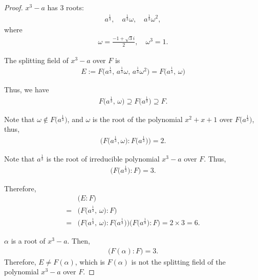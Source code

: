 \documentclass[utf8]{ctexbook}
\theoremstyle{definition}
\begin{document}
\begin{proof}
$x^3 - a$ has $3$ roots:
\begin{align*}
a^{\frac{1}{3}}, \quad a^{\frac{1}{3}}\omega, \quad a^{\frac{1}{3}} \omega^2, 
\end{align*}
where
\begin{align*}
\omega = \frac{-1 + \sqrt{3} i }{2}, \quad \omega^3 = 1.
\end{align*}

The splitting field of $x^3 - a$ over $F$ is
\begin{align*}
E := F\big(  a^{\frac{1}{3}}, \, a^{\frac{1}{3}}\omega, \, a^{\frac{1}{3}} \omega^2 \big) = F \big( a^{\frac{1}{3}} , \,   \omega \big)
\end{align*}

Thus, we have
\begin{align*}
 F \big( a^{\frac{1}{3}} , \,   \omega \big) \supseteq  F \big( a^{\frac{1}{3}} \big) \supseteq F .
\end{align*}

Note that $\omega \not \in  F \big( a^{\frac{1}{3}} \big) $, and $\omega $ is the root of the polynomial $x^2 + x + 1$ over $F \big( a^{\frac{1}{3}} \big) $, thus,
\begin{align*}
\big( F \big( a^{\frac{1}{3}}, \omega \big) : F \big( a^{\frac{1}{3}} \big)  \big) = 2 .
\end{align*} 

Note that $a^{\frac{1}{3}}$ is the root of irreducible polynomial $x^3 - a$ over $F$. Thus,
\begin{align*}
\big( F \big( a^{\frac{1}{3}} \big) : F \big) = 3 .
\end{align*}

Therefore,
\begin{align*}
& \big( E : F \big) \\
=& \big( F \big( a^{\frac{1}{3}} , \,   \omega \big) : F\big) \\
=& \big( F \big( a^{\frac{1}{3}} , \,   \omega \big) : F \big( a^{\frac{1}{3}} \big)  \big) \big( F\big(  a^{\frac{1}{3}} \big)  : F\big) = 2 \times 3 = 6 .
\end{align*}

$\alpha$ is a root of $x^3 - a$. Then,
\begin{align*}
\big(F(\alpha) : F  \big) = 3 .
\end{align*}
Therefore, $E \neq F(\alpha)$, which is $F(\alpha)$ is not the splitting field of the polynomial $x^3 - a$ over $F$.

\end{proof}
\end{document}
